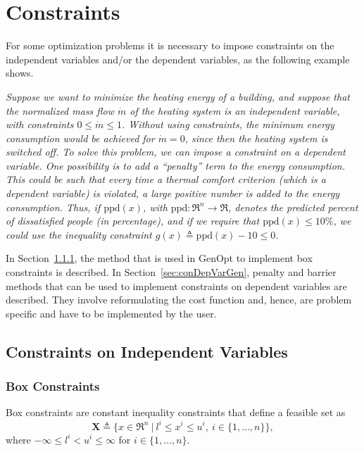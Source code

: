 \chapter{Constraints}
\label{cha:conGen}
For some optimization problems it is necessary to impose constraints 
on the independent variables and/or the dependent variables, as the following example shows.

\begin{example}{\em
Suppose we want to minimize the heating energy of a building, and suppose that
the normalized mass flow $\dot m$ of the heating system is an independent variable, with constraints
$0 \le \dot m \le 1$.
Without using constraints, the minimum energy consumption would be achieved 
for $\dot m = 0$, since then the heating system is switched off.
To solve this problem, we can impose a constraint on a dependent variable.
One possibility is to add a ``penalty'' term to the energy consumption. 
This could be such that every time a thermal comfort criterion 
(which is a dependent variable)
is violated, a large positive number is added to the energy consumption.
Thus, if $\mathrm{ppd}(x)$, with $\mathrm{ppd} \colon \Re^n \to \Re$, 
denotes the predicted percent of dissatisfied people (in percentage), and
if we require that $\mathrm{ppd}(x) \le 10 \%$, we could use the inequality constraint
$g(x) \triangleq \mathrm{ppd}(x) - 10 \le 0$.
}
\phantom{abc} \rbox
\end{example}

In Section~\ref{sec:boxConFre}, the method that is used in GenOpt to implement box constraints is 
described.
In Section~\ref{sec:conDepVarGen}, penalty and barrier methods that can be used to 
implement constraints on dependent variables are described.
They involve reformulating the cost function and, hence, are problem specific and 
have to be implemented by the user.

\section{Constraints on Independent Variables}
\label{sec:conFreParGen}
\subsection{Box Constraints}
\label{sec:boxConFre}

Box constraints are constant inequality constraints that define a feasible set as
\begin{equation}
\mathbf X \triangleq \bigl\{ x \in \Re^n \ | \ 
l^i \le x^i \le u^i, \ i \in \{1, \ldots, n \} \bigr\},
\end{equation}
where $-\infty \le l^i < u^i \le \infty$ for $i \in \{1, \ldots, n \}$.

